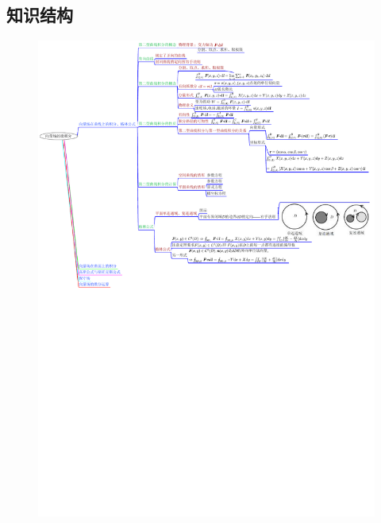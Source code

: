 \documentclass[12pt,UTF8]{ctexart}
\begin{document}
\subsection{知识结构}
\begin{figure}[H]
\begin{center}
\includegraphics[height=1\textheight,angle=0]{20190612-1.pdf}
\end{center}
\end{figure}
\end{document}
